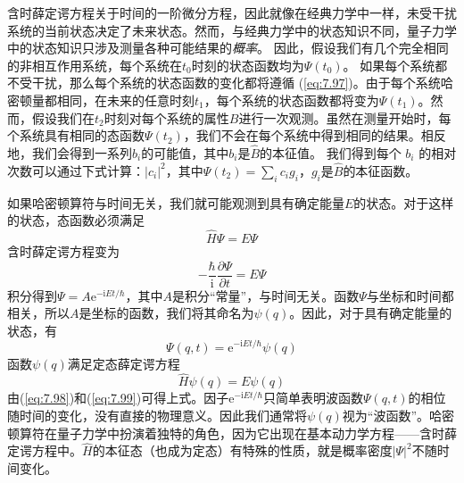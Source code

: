     \begin{center}
    \end{center}

    含时薛定谔方程关于时间的一阶微分方程，因此就像在经典力学中一样，未受干扰系统的当前状态决定了未来状态。然而，与经典力学中的状态知识不同，量子力学中的状态知识只涉及测量各种可能结果的\textit{概率}。 因此，假设我们有几个完全相同的非相互作用系统，每个系统在$t_0$时刻的状态函数均为$\Psi\left(t_0\right)$。 如果每个系统都不受干扰，那么每个系统的状态函数的变化都将遵循 (\ref{eq:7.97})。由于每个系统哈密顿量都相同，在未来的任意时刻$t_1$，每个系统的状态函数都将变为$\Psi\left(t_1\right)$。然而，假设我们在$t_2$时刻对每个系统的属性$B$进行一次观测。虽然在测量开始时，每个系统具有相同的态函数$\Psi\left(t_2\right)$，我们不会在每个系统中得到相同的结果。相反地，我们会得到一系列$b_i$的可能值，其中$b_i$是$\hat{B}$的本征值。 我们得到每个 $b_i$ 的相对次数可以通过下式计算：$\left|c_i\right|^2$，其中$\Psi\left(t_2\right) = \sum_{i}c_ig_i$，$g_i$是$\hat{B}$的本征函数。

    如果哈密顿算符与时间无关，我们就可能观测到具有确定能量$E$的状态。对于这样的状态，态函数必须满足
    \begin{equation}
        \hat{H}\Psi = E\Psi
        \label{eq:7.98}
    \end{equation}
    含时薛定谔方程变为
    \begin{equation*}
            -\frac{\hbar}{\mathrm{i}}\frac{\partial\Psi}{\partial t} = E\Psi
    \end{equation*}
    积分得到$\Psi = A\mathrm{e}^{-\mathrm{i}Et/\hbar}$，其中$A$是积分“常量”，与时间无关。函数$\Psi$与坐标和时间都相关，所以$A$是坐标的函数，我们将其命名为$\psi\left(q\right)$。因此，对于具有确定能量的状态，有
    \begin{equation}
        \Psi\left(q,t\right) = \mathrm{e}^{-\mathrm{i}Et/\hbar}\psi\left(q\right)
        \label{eq:7.99}
    \end{equation}
    函数$\psi\left(q\right)$满足定态薛定谔方程
    \begin{equation*}
        \hat{H}\psi\left(q\right) = E\psi\left(q\right)
    \end{equation*}
    由(\ref{eq:7.98})和(\ref{eq:7.99})可得上式。因子$\mathrm{e}^{-\mathrm{i}Et/\hbar}$只简单表明波函数$\Psi\left(q,t\right)$的相位随时间的变化，没有直接的物理意义。因此我们通常将$\psi\left(q\right)$视为“波函数”。哈密顿算符在量子力学中扮演着独特的角色，因为它出现在基本动力学方程——含时薛定谔方程中。$\hat{H}$的本征态（也成为定态）有特殊的性质，就是概率密度$\left|\Psi\right|^2$不随时间变化。

